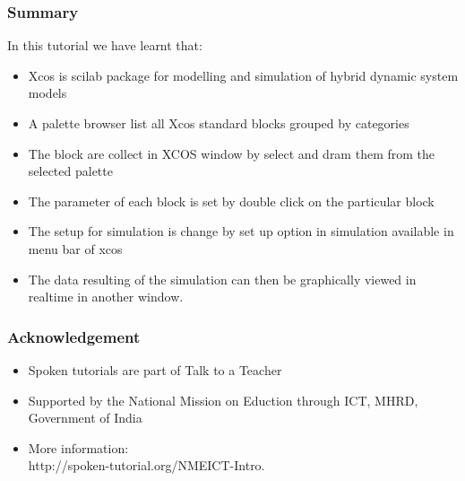 \documentclass[brown]{beamer}[17pt]
\begin{document}
\begin{frame}[fragile]
\frametitle{Summary}
In this tutorial we have learnt that:
\begin{itemize}
\item Xcos is scilab package for modelling and simulation of hybrid dynamic system models
\item A palette browser list all Xcos standard blocks grouped by categories
\item The block are collect in XCOS window by select and dram them from the selected palette
\item The parameter of each block is set by double click on the particular block
\item The setup for simulation is change by set up option in simulation available in menu bar of xcos
\item The data resulting of the simulation can then be graphically viewed in realtime in another window.
\end{itemize}
\end{frame}


\begin{frame}[fragile]
\frametitle{Acknowledgement}
\begin{itemize}
\item Spoken tutorials are part of Talk to a Teacher
\item Supported by the National Mission on Eduction through ICT, MHRD, Government of India
\item More information: \\
	{\color{magenta}http://spoken-tutorial.org/NMEICT-Intro.}

\end{itemize}
\end{frame}
\end{document}
